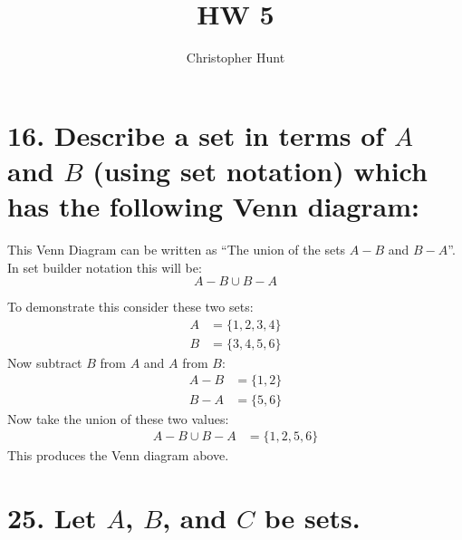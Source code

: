 \documentclass{article}
\title{HW 5}
\author{Christopher Hunt}
\date{}
\begin{document}
\pagestyle{fancy}
\fancyhf{}
\rhead{\thepage}
\maketitle

\section*{16. Describe a set in terms of $A$ and $B$ (using set notation) which has the following Venn diagram:}
\begin{center}
\end{center}

\noindent This Venn Diagram can be written as \enquote{The union of the sets $A-B$ and $B-A$}. In set builder notation this will be:
$$ A-B \cup B-A$$

\noindent To demonstrate this consider these two sets:
\begin{align*}
    A&=\{1,2,3,4\}\\
    B&=\{3,4,5,6\}
\end{align*}
Now subtract $B$ from $A$ and $A$ from $B$:
\begin{align*}
    A-B&=\{1,2\}\\
    B-A&=\{5,6\}
\end{align*}
Now take the union of these two values:
\begin{align*}
    A-B\cup B-A&=\{1,2,5,6\}
\end{align*}
This produces the Venn diagram above.
\newpage

\section*{25. Let $A$, $B$, and $C$ be sets.}
\end{document}

